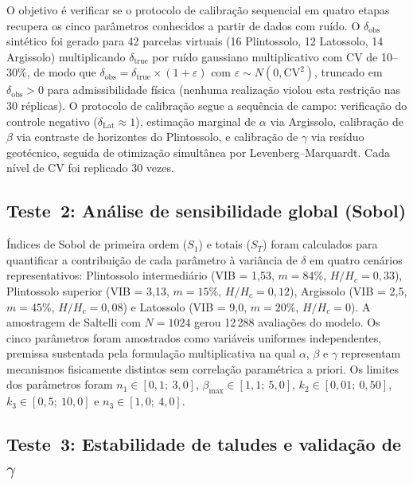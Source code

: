 \documentclass[pdflatex,sn-basic]{sn-jnl}
\begin{document}
O objetivo é verificar se o protocolo de calibração sequencial em quatro etapas recupera os cinco parâmetros conhecidos a partir de dados com ruído. O $\delta_{\mathrm{obs}}$ sintético foi gerado para 42 parcelas virtuais (16 Plintossolo, 12 Latossolo, 14 Argissolo) multiplicando $\delta_{\mathrm{true}}$ por ruído gaussiano multiplicativo com CV de 10--30\%, de modo que $\delta_{\mathrm{obs}} = \delta_{\mathrm{true}} \times (1 + \varepsilon)$ com $\varepsilon \sim N(0, \mathrm{CV}^2)$, truncado em $\delta_{\mathrm{obs}} > 0$ para admissibilidade física (nenhuma realização violou esta restrição nas 30 réplicas). O protocolo de calibração segue a sequência de campo: verificação do controle negativo ($\delta_{\mathrm{Lat}} \approx 1$), estimação marginal de $\alpha$ via Argissolo, calibração de $\beta$ via contraste de horizontes do Plintossolo, e calibração de $\gamma$ via resíduo geotécnico, seguida de otimização simultânea por Levenberg--Marquardt. Cada nível de CV foi replicado 30 vezes.

\subsection{Teste~2: Análise de sensibilidade global (Sobol)}

Índices de Sobol de primeira ordem ($S_1$) e totais ($S_T$) \citep{sobol_2001} foram calculados para quantificar a contribuição de cada parâmetro à variância de $\delta$ em quatro cenários representativos: Plintossolo intermediário (VIB = 1,53, $m = 84\%$, $H/H_c = 0{,}33$), Plintossolo superior (VIB = 3,13, $m = 15\%$, $H/H_c = 0{,}12$), Argissolo (VIB = 2,5, $m = 45\%$, $H/H_c = 0{,}08$) e Latossolo (VIB = 9,0, $m = 20\%$, $H/H_c = 0$). A amostragem de Saltelli \citep{saltelli_et_al_2004} com $N = 1024$ gerou 12\,288 avaliações do modelo. Os cinco parâmetros foram amostrados como variáveis uniformes independentes, premissa sustentada pela formulação multiplicativa na qual $\alpha$, $\beta$ e $\gamma$ representam mecanismos fisicamente distintos sem correlação paramétrica a priori. Os limites dos parâmetros foram $n_1 \in [0{,}1;~3{,}0]$, $\beta_{\max} \in [1{,}1;~5{,}0]$, $k_2 \in [0{,}01;~0{,}50]$, $k_3 \in [0{,}5;~10{,}0]$ e $n_3 \in [1{,}0;~4{,}0]$.

\subsection{Teste~3: Estabilidade de taludes e validação de \texorpdfstring{$\gamma$}{gama}}
\label{sec:test3}
\end{document}
